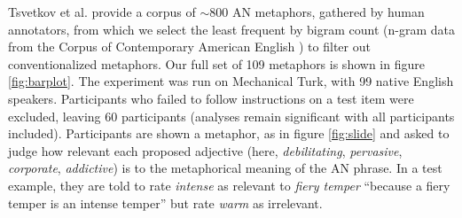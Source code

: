 \documentclass[9pt,twocolumn,twoside,lineno]{pnas-new}
\begin{document}
{		
		Tsvetkov et al. \cite{tsvetkov2014metaphor} provide a corpus of $\sim$800 AN metaphors, gathered by human annotators, from which we select the least frequent by bigram count (n-gram data from the Corpus of Contemporary American English \cite{davies2011word}) to filter out conventionalized metaphors. Our full set of 109 metaphors is shown in figure \ref{fig:barplot}.
		The experiment was run on Mechanical Turk, with 99 native English speakers. Participants who failed to follow instructions on a test item were excluded, leaving 60 participants (analyses remain significant with all participants included).
		Participants are shown a metaphor, as in figure \ref{fig:slide} and asked to judge how relevant each proposed adjective (here, \emph{debilitating}, \emph{pervasive}, \emph{corporate}, \emph{addictive}) is to the metaphorical meaning of the AN phrase. In a test example, they are told to rate \emph{intense} as relevant to \emph{fiery temper} ``because a fiery temper is an intense temper'' but rate \emph{warm} as irrelevant.

}

\showmatmethods{} %




\end{document}
